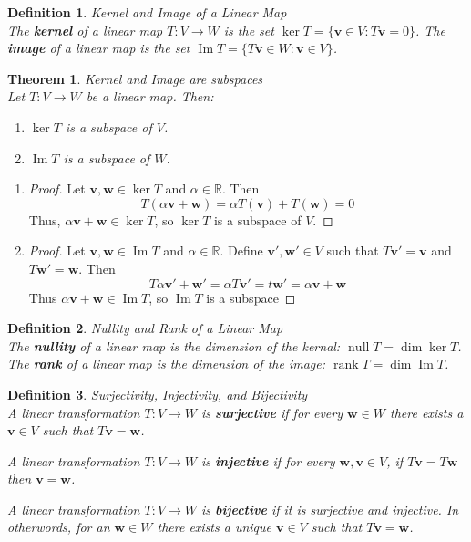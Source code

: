 \documentclass[12pt]{article}
\newtheorem{thm}{Theorem}[section] %
\theoremstyle{plain}
\newtheorem{definition}{Definition}[section]
\newcommand{\R}{\mathbb{R}}
\DeclareMathOperator{\nul}{null}
\DeclareMathOperator{\rank}{rank}
\DeclareMathOperator{\im}{Im}
\newcommand{\vv}{\mathbf{v}}
\newcommand{\vw}{\mathbf{w}}
\begin{document}
    \begin{definition}{Kernel and Image of a Linear Map}
        ~\\The \textbf{kernel} of a linear map $T:V \to W$ is the set $\ker T = \{\vv \in V : T\vv = 0\}$. The \textbf{image} of a linear map is the set $\im T = \{T\vv \in W : \vv \in V\}$.
    \end{definition}

    \begin{thm}{Kernel and Image are subspaces}
        ~\\Let $T:V \to W$ be a linear map. Then:
        \begin{enumerate}
            \item $\ker T$ is a subspace of $V$.
            \item $\im T$ is a subspace of $W$.
        \end{enumerate}
    \end{thm}
    
    \begin{enumerate}
        \item \begin{proof}
            Let $\vv, \vw \in \ker T$ and $\alpha \in \R$. Then 
                $$T(\alpha \vv + \vw) = \alpha T(\vv) + T(\vw) = 0$$
            Thus, $\alpha \vv + \vw \in \ker T$, so $\ker T$ is a subspace of $V$.
        \end{proof}

        \item \begin{proof}
            Let $\vv, \vw \in \im T$ and $\alpha \in \R$. Define $\vv', \vw' \in V$ such that $T\vv' = \vv$ and $T\vw' = \vw$. Then 
                $$T\alpha \vv' + \vw' = \alpha T\vv' = t\vw' = \alpha \vv + \vw$$
            Thus $\alpha \vv + \vw \in \im T$, so $\im T$ is a subspace
        \end{proof}
    \end{enumerate}

    \begin{definition}{Nullity and Rank of a Linear Map}
        ~\\The \textbf{nullity} of a linear map is the dimension of the kernal: $\nul T = \dim \ker T$. The \textbf{rank} of a linear map is the dimension of the image: $\rank T = \dim \im T$.
    \end{definition}

    \begin{definition}{Surjectivity, Injectivity, and Bijectivity}
        ~\\A linear transformation $T:V \to W$ is \textbf{surjective} if for every $\vw \in W$ there exists a $\vv \in V$ such that $T\vv = \vw$. 

        A linear transformation $T:V \to W$ is \textbf{injective} if for every $\vw, \vv \in V$, if $T\vv = T\vw$ then $\vv = \vw$. 

        A linear transformation $T:V \to W$ is \textbf{bijective} if it is surjective and injective. In otherwords, for an $\vw \in W$ there exists a unique $\vv \in V$ such that $T\vv = \vw$.
    \end{definition}
\end{document}
